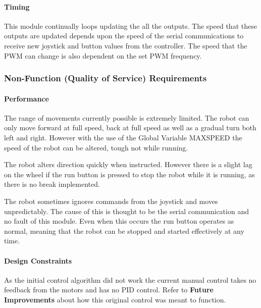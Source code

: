 \documentclass{article}
\begin{document}
	\paragraph{Timing}
	
	This module continually loops updating the all the outputs. The speed that these outputs are updated depends upon the speed of the serial communications to receive new joystick and button values from the controller. The speed that the PWM can change is also dependent on the set PWM frequency.
	
	
	\subsubsection{Non-Function (Quality of Service) Requirements}
	\paragraph{Performance}
	
	The range of movements currently possible is extremely limited. The robot can only move forward at full speed, back at full speed as well as a gradual turn both left and right. However with the use of the Global Variable MAX\textunderscore SPEED the speed of the robot can be altered, tough not while running.
	
	The robot alters direction quickly when instructed. However there is a slight lag on the wheel if the run button is pressed to stop the robot while it is running, as there is no break implemented.
	
	The robot sometimes ignores commands from the joystick and moves unpredictably. The cause of this is thought to be the serial communication and no fault of this module. Even when this occurs the run button operates as normal, meaning that the robot can be stopped and started effectively at any time.
	
	
	\paragraph{Design Constraints}
	As the initial control algorithm did not work the current manual control takes no feedback from the motors and has no PID control. Refer to \textbf{Future Improvements} about how this original control was meant to function.
	
\end{document}
